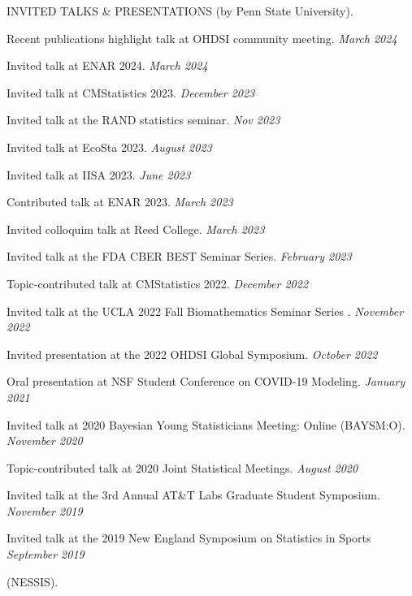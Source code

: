 \documentclass{resume} %
\begin{document}
\begin{rSection}{INVITED TALKS \& PRESENTATIONS}
	\vspace{-0.1in}
	(by Penn State University).
	
	Recent publications highlight talk at OHDSI community meeting. \hfill {\em March 2024}
	
	Invited talk at ENAR 2024.  \hfill {\em March 2024}
	
	Invited talk at CMStatistics 2023. \hfill {\em December 2023}
	
	Invited talk at the RAND statistics seminar. \hfill {\em Nov 2023}
	
	Invited talk at EcoSta 2023. \hfill {\em August 2023}
	
	Invited talk at IISA 2023.  \hfill {\em June 2023}
	
	
	Contributed talk at ENAR 2023. \hfill {\em March 2023}
	
	Invited colloquim talk at Reed College. \hfill {\em March 2023}
	
	Invited talk at the FDA CBER BEST Seminar Series. \hfill {\em February 2023}
	
	Topic-contributed talk at CMStatistics 2022. \hfill {\em December 2022}
	
	Invited talk at the UCLA 2022 Fall Biomathematics Seminar Series . \hfill {\em November 2022}
	
	Invited presentation at the 2022 OHDSI Global Symposium.  \hfill {\em October 2022}
	
	{Oral presentation at NSF Student Conference on COVID-19 Modeling.} \hfill {\em January 2021}
	
	{Invited talk at 2020 Bayesian Young Statisticians Meeting: Online (BAYSM:O).} \hfill {\em November 2020}
	
	{Topic-contributed talk at 2020 Joint Statistical Meetings. } \hfill {\em August 2020}
	
	{Invited talk at the 3rd Annual AT\&T Labs Graduate Student Symposium.} \hfill {\em November 2019}
	
	
	{Invited talk at the 2019 New England Symposium on Statistics in Sports} \hfill {\em September 2019}
	
	\vspace{-0.1in}
	(NESSIS).
	

\end{rSection}
\end{document}
